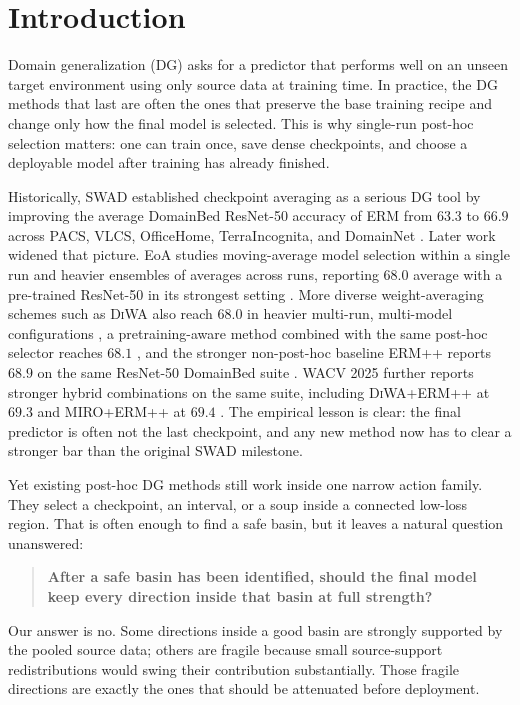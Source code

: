 \documentclass{article}
\newcommand{\swad}{\textup{\textsc{SWAD}}}
\newcommand{\diwa}{\textup{\textsc{DiWA}}}
\newcommand{\miro}{\textup{\textsc{MIRO}}}
\newcommand{\erm}{\textup{\textsc{ERM}}}
\begin{document}
\section{Introduction}

Domain generalization (DG) asks for a predictor that performs well on an unseen target environment using only source data at training time. In practice, the DG methods that last are often the ones that preserve the base training recipe and change only how the final model is selected. This is why single-run post-hoc selection matters: one can train once, save dense checkpoints, and choose a deployable model after training has already finished.

Historically, \swad{} established checkpoint averaging as a serious DG tool by improving the average DomainBed ResNet-50 accuracy of \erm{} from \(63.3\) to \(66.9\) across PACS, VLCS, OfficeHome, TerraIncognita, and DomainNet \citep{cha2021swad}. Later work widened that picture. EoA studies moving-average model selection within a single run and heavier ensembles of averages across runs, reporting \(68.0\) average with a pre-trained ResNet-50 in its strongest setting \citep{arpit2022eoa}. More diverse weight-averaging schemes such as \diwa{} also reach \(68.0\) in heavier multi-run, multi-model configurations \citep{rame2022diwa}, a pretraining-aware method combined with the same post-hoc selector reaches \(68.1\) \citep{cha2022miro}, and the stronger non-post-hoc baseline \textsc{ERM++} reports \(68.9\) on the same ResNet-50 DomainBed suite \citep{teterwak2025ermpp}. WACV 2025 further reports stronger hybrid combinations on the same suite, including \diwa{}+\textsc{ERM++} at \(69.3\) and \miro{}+\textsc{ERM++} at \(69.4\) \citep{teterwak2025ermpp}. The empirical lesson is clear: the final predictor is often not the last checkpoint, and any new method now has to clear a stronger bar than the original \swad{} milestone.

Yet existing post-hoc DG methods still work inside one narrow action family. They select a checkpoint, an interval, or a soup inside a connected low-loss region. That is often enough to find a safe basin, but it leaves a natural question unanswered:
\begin{quote}
\textbf{After a safe basin has been identified, should the final model keep every direction inside that basin at full strength?}
\end{quote}

Our answer is no. Some directions inside a good basin are strongly supported by the pooled source data; others are fragile because small source-support redistributions would swing their contribution substantially. Those fragile directions are exactly the ones that should be attenuated before deployment.
\end{document}
